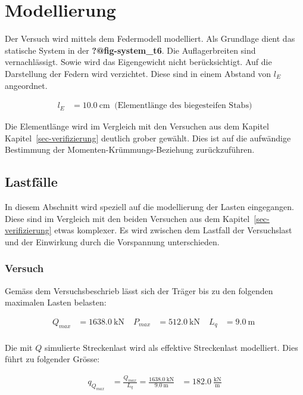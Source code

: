 \documentclass[
  11pt,
  letterpaper,
]{scrreprt}
\begin{document}
\section{Modellierung}\label{modellierung-2}

Der Versuch wird mittels dem Federmodell modelliert. Als Grundlage dient
das statische System in der \textbf{?@fig-system\_t6}. Die
Auflagerbreiten sind vernachlässigt. Sowie wird das Eigengewicht nicht
berücksichtigt. Auf die Darstellung der Federn wird verzichtet. Diese
sind in einem Abstand von \(l_E\) angeordnet.

$$
\begin{aligned}
l_{E} &= 10.0\ \mathrm{cm} \; \;\textrm{(Elementlänge des biegesteifen Stabs)}
\end{aligned}
$$

Die Elementlänge wird im Vergleich mit den Versuchen aus dem Kapitel
Kapitel~\ref{sec-verifizierung} deutlich grober gewählt. Dies ist auf
die aufwändige Bestimmung der Momenten-Krümmungs-Beziehung
zurückzuführen.

\subsection{Lastfälle}\label{lastfuxe4lle}

In diesem Abschnitt wird speziell auf die modellierung der Lasten
eingegangen. Diese sind im Vergleich mit den beiden Versuchen aus dem
Kapitel~\ref{sec-verifizierung} etwas komplexer. Es wird zwischen dem
Lastfall der Versuchslast und der Einwirkung durch die Vorspannung
unterschieden.

\subsubsection{Versuch}\label{versuch}

Gemäss dem Versuchsbeschrieb lässt sich der Träger bis zu den folgenden
maximalen Lasten belasten:

$$
\begin{aligned}
Q_{max} &= 1638.0\ \mathrm{kN} \; 
 &P_{max} &= 512.0\ \mathrm{kN} \; 
 &L_{q} &= 9.0\ \mathrm{m} \; 
\\[10pt]
\end{aligned}
$$

Die mit \(Q\) simulierte Streckenlast wird als effektive Streckenlast
modelliert. Dies führt zu folgender Grösse:

$$
\begin{aligned}
q_{Q_{max}} &= \frac{ Q_{max} }{ L_{q} }  = \frac{ 1638.0\ \mathrm{kN} }{ 9.0\ \mathrm{m} } &= 182.0\ \frac{\mathrm{kN}}{\mathrm{m}}  
\end{aligned}
$$
\end{document}
